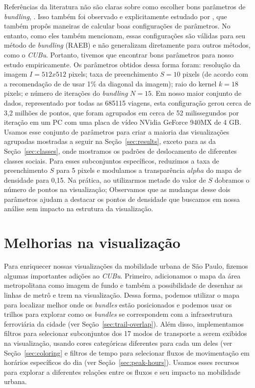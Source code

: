 Referências da literatura não são claras sobre como escolher bons parâmetros de
\emph{bundling}, \citet{Lhuillier2017}. Isso também foi observado e explicitamente
estudado por \citet{zeng:19}, que também propôs maneiras de calcular boas
configurações de parâmetros. No entanto, como eles também mencionam, essas
configurações são válidas para seu método de \emph{bundling} (RAEB) e não
generalizam diretamente para outros métodos, como o \emph{CUBu}. Portanto,
tivemos que encontrar bons parâmetros para nosso estudo empiricamente. Os
parâmetros obtidos dessa forma foram: resolução da imagem $I = 512 x 512$
pixels; taxa de preenchimento $S = 10$ pixels (de acordo com a recomendação de
\cite{zwan:16} de usar 1\% da diagonal da imagem); raio do kernel $k = 18$
pixels; e número de iterações do \emph{bundling} $N = 15$. Em nosso maior
conjunto de dados, representado por todas as \num{685115} viagens, esta
configuração gerou cerca de 3,2 milhões de pontos, que foram agrupados em cerca
de 52 milissegundos por iteração em um PC com uma placa de vídeo NVidia GeForce
940MX de 4 GB. Usamos esse conjunto de parâmetros para criar a maioria das
visualizações agrupadas mostradas a seguir na Seção~\ref{sec:results}, exceto para as da Seção~\ref{sec:classes},
onde mostramos os padrões de deslocamento de diferentes classes sociais.
Para esses subconjuntos específicos, reduzimos a taxa de preenchimento $S$ para
5 pixels e modulamos a transparência $alpha$ do mapa de densidade para 0,15. Na
prática, ao utilizarmos metade do valor de $S$ dobramos o número de pontos na
visualização;  Observamos que as mudanças desse dois parâmetros ajudam a
destacar os pontos de densidade que buscamos em nossa análise sem impacto na
estrutura da visualização.


\section{Melhorias na visualização}

Para enriquecer nossas visualizações da mobilidade urbana de São Paulo, fizemos
algumas importantes adições ao \emph{CUBu}. Primeiro, adicionamos o mapa da área
metropolitana como imagem de fundo e também a possibilidade de desenhar as
linhas de metrô e trem na visualização. Dessa forma, podemos utilizar o mapa
para localizar melhor onde os \emph{bundles} estão posicionados e podemos usar
os trilhos para explorar como os \emph{bundles} se correspondem com a
infraestrutura ferroviária da cidade (ver Seção~\ref{sec:trail-overlap}). Além
disso, implementamos filtros para selecionar subconjuntos dos 17 modos de
transporte a serem exibidos na visualização, usando cores categóricas diferentes
para cada um deles (ver Seção~\ref{sec:coloring} e filtros de tempo para selecionar fluxos de movimentação em
horários específicos do dia (ver Seção~\ref{sec:peak-hours}). Usamos esses recursos para explorar a diferentes
relações entre os fluxos e seu impacto na mobilidade urbana.
